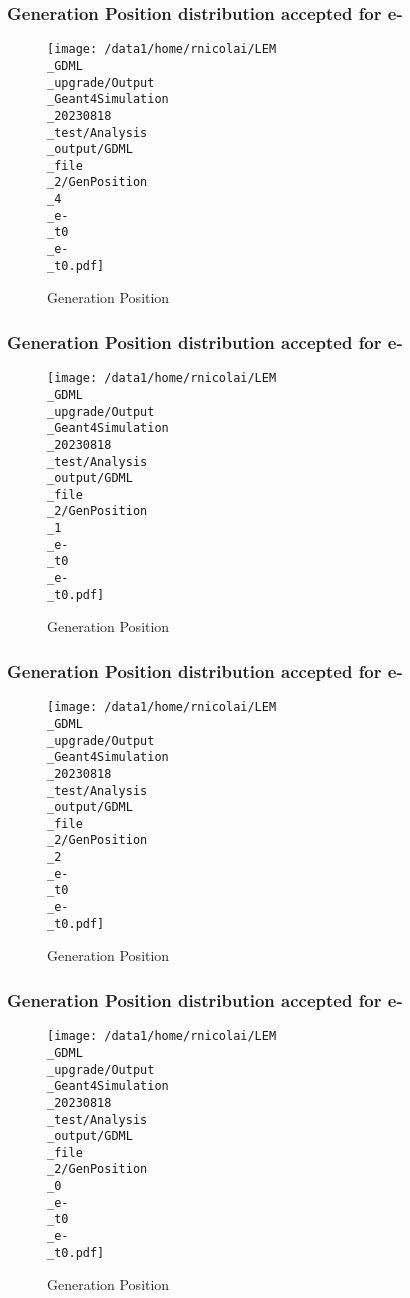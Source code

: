 \documentclass[8pt]{beamer}
\begin{document}
            \begin{frame}
                \frametitle{Generation Position distribution accepted for e-}
            
        \begin{figure}[h]
            \centering
            \texttt{[image: /data1/home/rnicolai/LEM\\\_GDML\\\_upgrade/Output\\\_Geant4Simulation\\\_20230818\\\_test/Analysis\\\_output/GDML\\\_file\\\_2/GenPosition\\\_4\\\_e-\\\_t0\\\_e-\\\_t0.pdf]}
            \caption{Generation Position}
        \end{figure}
        
            \end{frame}
            
            \begin{frame}
                \frametitle{Generation Position distribution accepted for e-}
            
        \begin{figure}[h]
            \centering
            \texttt{[image: /data1/home/rnicolai/LEM\\\_GDML\\\_upgrade/Output\\\_Geant4Simulation\\\_20230818\\\_test/Analysis\\\_output/GDML\\\_file\\\_2/GenPosition\\\_1\\\_e-\\\_t0\\\_e-\\\_t0.pdf]}
            \caption{Generation Position}
        \end{figure}
        
            \end{frame}
            
            \begin{frame}
                \frametitle{Generation Position distribution accepted for e-}
            
        \begin{figure}[h]
            \centering
            \texttt{[image: /data1/home/rnicolai/LEM\\\_GDML\\\_upgrade/Output\\\_Geant4Simulation\\\_20230818\\\_test/Analysis\\\_output/GDML\\\_file\\\_2/GenPosition\\\_2\\\_e-\\\_t0\\\_e-\\\_t0.pdf]}
            \caption{Generation Position}
        \end{figure}
        
            \end{frame}
            
            \begin{frame}
                \frametitle{Generation Position distribution accepted for e-}
            
        \begin{figure}[h]
            \centering
            \texttt{[image: /data1/home/rnicolai/LEM\\\_GDML\\\_upgrade/Output\\\_Geant4Simulation\\\_20230818\\\_test/Analysis\\\_output/GDML\\\_file\\\_2/GenPosition\\\_0\\\_e-\\\_t0\\\_e-\\\_t0.pdf]}
            \caption{Generation Position}
        \end{figure}
        
            \end{frame}
            
\end{document}
